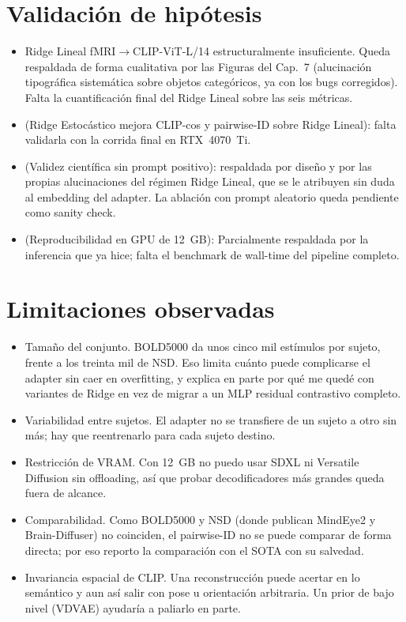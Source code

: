 \section{Validación de hipótesis}

\begin{itemize}
\item[H1.] Ridge Lineal fMRI$\rightarrow$CLIP-ViT-L/14 estructuralmente insuficiente. Queda 
respaldada de forma cualitativa por las Figuras del Cap.~7 (alucinación tipográfica sistemática 
sobre objetos categóricos, ya con los bugs corregidos). Falta la cuantificación final del Ridge 
Lineal sobre las seis métricas.
\item[H2.] (Ridge Estocástico mejora CLIP-cos y pairwise-ID sobre Ridge Lineal):
falta validarla con la corrida final en RTX~4070~Ti.
\item[H3.] (Validez científica sin prompt positivo): respaldada por diseño y por las
propias alucinaciones del régimen Ridge Lineal, que se le atribuyen sin
duda al embedding del adapter. La ablación con prompt aleatorio queda
pendiente como sanity check.
\item[H4.] (Reproducibilidad en GPU de 12~GB): Parcialmente respaldada por la inferencia que ya 
hice; falta el benchmark de wall-time del pipeline completo.
\end{itemize}

\section{Limitaciones observadas}

\begin{itemize}
\item[•] Tamaño del conjunto. BOLD5000 da unos cinco mil estímulos por sujeto, frente a los 
treinta mil de NSD. Eso limita cuánto puede complicarse el adapter sin caer en overfitting, y 
explica en parte por qué me quedé con variantes de Ridge en vez de migrar a un MLP residual 
contrastivo completo.
\item[•] Variabilidad entre sujetos. El adapter no se transfiere de un sujeto a otro sin más; 
hay que reentrenarlo para cada sujeto destino.
\item[•] Restricción de VRAM. Con 12~GB no puedo usar SDXL ni Versatile Diffusion sin offloading, 
así que probar decodificadores más grandes queda fuera de alcance.
\item[•] Comparabilidad. Como BOLD5000 y NSD (donde publican MindEye2 y Brain-Diffuser) no 
coinciden, el pairwise-ID no se puede comparar de forma directa; por eso reporto la comparación 
con el SOTA con su salvedad.
\item[•] Invariancia espacial de CLIP. Una reconstrucción puede acertar en lo semántico y aun 
así salir con pose u orientación arbitraria. Un prior de bajo nivel (VDVAE) ayudaría a paliarlo 
en parte.
\end{itemize}

